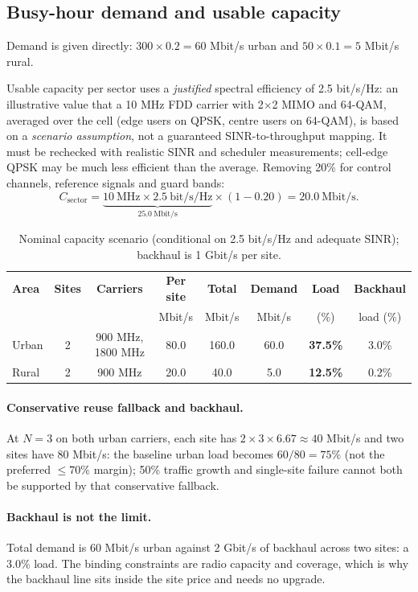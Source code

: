 \documentclass[9pt,a4paper]{extarticle}
\begin{document}
\subsection{Busy-hour demand and usable capacity}
Demand is given directly: $300\times0.2=60$ Mbit/s urban and $50\times0.1=5$ Mbit/s rural.

Usable capacity per sector uses a \emph{justified} spectral efficiency of 2.5 bit/s/Hz: an illustrative value that a
10 MHz FDD carrier with 2$\times$2 MIMO and 64-QAM, averaged over the cell (edge users on QPSK,
centre users on 64-QAM), is based on a \emph{scenario assumption}, not a guaranteed
SINR-to-throughput mapping. It must be rechecked with realistic SINR and scheduler
measurements; cell-edge QPSK may be much less efficient than the average. Removing 20\% for control channels, reference
signals and guard bands:
\[
C_{\text{sector}} = \underbrace{10\ \text{MHz}\times2.5\ \text{bit/s/Hz}}_{25.0\ \text{Mbit/s}}
\times(1-0.20) = 20.0\ \text{Mbit/s}.
\]

\begin{table}[H]\centering\small
\caption{Nominal capacity scenario (conditional on 2.5 bit/s/Hz and adequate SINR); backhaul is 1 Gbit/s per site.}
\label{tab:cap}
\begin{tabular}{@{}lccccccc@{}}
\toprule
\textbf{Area} & \textbf{Sites} & \textbf{Carriers} & \textbf{Per site} & \textbf{Total} &
\textbf{Demand} & \textbf{Load} & \textbf{Backhaul} \\
& & & Mbit/s & Mbit/s & Mbit/s & (\%) & load (\%) \\
\midrule
Urban & 2 & 900 MHz, 1800 MHz & 80.0 & 160.0 & 60.0 & \textbf{37.5\%} & 3.0\% \\
Rural & 2 & 900 MHz & 20.0 & 40.0 & 5.0 & \textbf{12.5\%} & 0.2\% \\
\bottomrule
\end{tabular}
\end{table}

\paragraph{Conservative reuse fallback and backhaul.} At $N=3$ on both urban
carriers, each site has $2\times3\times6.67\approx40$ Mbit/s and
two sites have 80 Mbit/s: the baseline urban load becomes
$60/80=75\%$ (not the preferred $\leq70\%$ margin); 50\% traffic growth
and single-site failure cannot both be supported by that conservative fallback.
\paragraph{Backhaul is not the limit.} Total demand is 60 Mbit/s urban against 2 Gbit/s of
backhaul across two sites: a 3.0\% load. The binding constraints are radio capacity and coverage,
which is why the backhaul line sits inside the site price and needs no upgrade.
\end{document}
